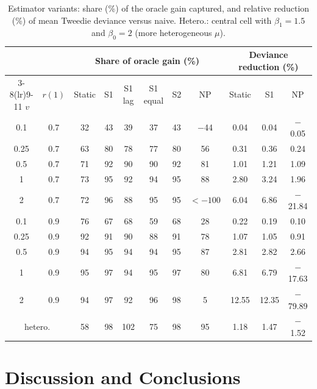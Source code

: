 \documentclass[mathematics,article,submit,moreauthors]{Definitions/mdpi}
\begin{document}
\begin{table}[H]
\caption{Estimator variants: share (\%) of the oracle gain captured, and relative reduction (\%) of mean Tweedie deviance versus naive. Hetero.: central cell with $\beta_1=1.5$ and $\beta_0=2$ (more heterogeneous $\mu$).\label{tab:variants}}
\small
\begin{tabular*}{\textwidth}{@{\extracolsep{\fill}}ccccccccccc@{}}
\toprule
 & & \multicolumn{6}{c}{Share of oracle gain (\%)} & \multicolumn{3}{c}{Deviance reduction (\%)} \\
\cmidrule(lr){3-8}\cmidrule(lr){9-11}
$v$ & $r(1)$ & Static & S1 & S1 lag & S1 equal & S2 & NP & Static & S1 & NP \\
\midrule
0.1 & 0.7 & 32 & 43 & 39 & 37 & 43 & $-$44 & 0.04 & 0.04 & $-$0.05 \\
0.25 & 0.7 & 63 & 80 & 78 & 77 & 80 & 56 & 0.31 & 0.36 & 0.24 \\
0.5 & 0.7 & 71 & 92 & 90 & 90 & 92 & 81 & 1.01 & 1.21 & 1.09 \\
1 & 0.7 & 73 & 95 & 92 & 94 & 95 & 88 & 2.80 & 3.24 & 1.96 \\
2 & 0.7 & 72 & 96 & 88 & 95 & 95 & $<-100$ & 6.04 & 6.86 & $-$21.84 \\
0.1 & 0.9 & 76 & 67 & 68 & 59 & 68 & 28 & 0.22 & 0.19 & 0.10 \\
0.25 & 0.9 & 92 & 91 & 90 & 88 & 91 & 78 & 1.07 & 1.05 & 0.91 \\
0.5 & 0.9 & 94 & 95 & 94 & 94 & 95 & 87 & 2.81 & 2.82 & 2.66 \\
1 & 0.9 & 95 & 97 & 94 & 95 & 97 & 80 & 6.81 & 6.79 & $-$17.63 \\
2 & 0.9 & 94 & 97 & 92 & 96 & 98 & 5 & 12.55 & 12.35 & $-$79.89 \\
\multicolumn{2}{c}{hetero.} & 58 & 98 & 102 & 75 & 98 & 95 & 1.18 & 1.47 & $-$1.52 \\
\bottomrule
\end{tabular*}
\end{table}

\section{Discussion and Conclusions}\label{sec:discussion}
\end{document}
